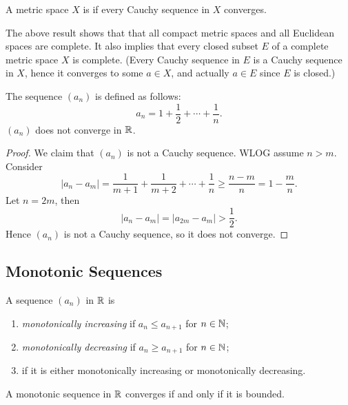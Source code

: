 \begin{definition}
A metric space $X$ is  if every Cauchy sequence in $X$ converges.
\end{definition}

\begin{remark}
The above result shows that that all compact metric spaces and all Euclidean spaces are complete. It also implies that every closed subset $E$ of a complete metric space $X$ is complete. (Every Cauchy sequence in $E$ is a Cauchy sequence in $X$, hence it converges to some $a\in X$, and actually $a\in E$ since $E$ is closed.)
\end{remark}

\begin{example}
The sequence $(a_n)$ is defined as follows:
\[a_n=1+\frac{1}{2}+\cdots+\frac{1}{n}.\]
$(a_n)$ does not converge in $\mathbb R$.
\begin{proof}
We claim that $(a_n)$ is not a Cauchy sequence. WLOG assume $n>m$. Consider
\[|a_n-a_m|=\frac{1}{m+1}+\frac{1}{m+2}+\cdots+\frac{1}{n}\ge\frac{n-m}{n}=1-\frac{m}{n}.\]
Let $n=2m$, then
\[|a_n-a_m|=|a_{2m}-a_m|>\frac{1}{2}.\]
Hence $(a_n)$ is not a Cauchy sequence, so it does not converge.
\end{proof}
\end{example}
\pagebreak

\subsection{Monotonic Sequences}
\begin{definition}
A sequence $(a_n)$ in $\mathbb R$ is
\begin{enumerate}[label=(\roman*)]
\item \emph{monotonically increasing} if $a_n\le a_{n+1}$ for $n\in\mathbb N$;
\item \emph{monotonically decreasing} if $a_n\ge a_{n+1}$ for $n\in\mathbb N$;
\item {} if it is either monotonically increasing or monotonically decreasing.
\end{enumerate}
\end{definition}

\begin{lemma}
A monotonic sequence in $\mathbb R$ converges if and only if it is bounded.
\end{lemma}

